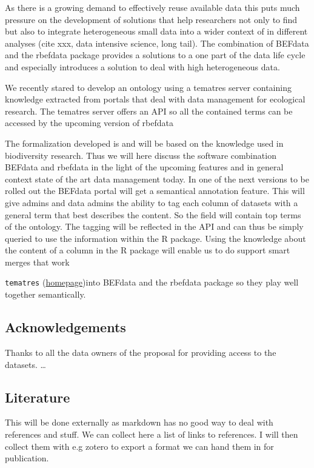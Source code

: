 \documentclass[]{article}
\begin{document}
As there is a growing demand to effectively reuse available data this
puts much pressure on the development of solutions that help researchers
not only to find but also to integrate heterogeneous small data into a
wider context of in different analyses (cite xxx, data intensive
science, long tail). The combination of BEFdata and the rbefdata package
provides a solutions to a one part of the data life cycle and especially
introduces a solution to deal with high heterogeneous data.

We recently stared to develop an ontology using a tematres server
containing knowledge extracted from portals that deal with data
management for ecological research. The tematres server offers an API so
all the contained terms can be accessed by the upcoming version of
rbefdata

The formalization developed is and will be based on the knowledge used
in biodiversity research. Thus we will here discuss the software
combination BEFdata and rbefdata in the light of the upcoming features
and in general context state of the art data management today. In one of
the next versions to be rolled out the BEFdata portal will get a
semantical annotation feature. This will give admins and data admins the
ability to tag each column of datasets with a general term that best
describes the content. So the field will contain top terms of the
ontology. The tagging will be reflected in the API and can thus be
simply queried to use the information within the R package. Using the
knowledge about the content of a column in the R package will enable us
to do support smart merges that work

\texttt{tematres}
(\href{http://www.vocabularyserver.com/}{homepage})into BEFdata and the
rbefdata package so they play well together semantically.

\subsection{Acknowledgements}

Thanks to all the data owners of the proposal for providing access to
the datasets. \ldots{}

\subsection{Literature}

This will be done externally as markdown has no good way to deal with
references and stuff. We can collect here a list of links to references.
I will then collect them with e.g zotero to export a format we can hand
them in for publication.
\end{document}
